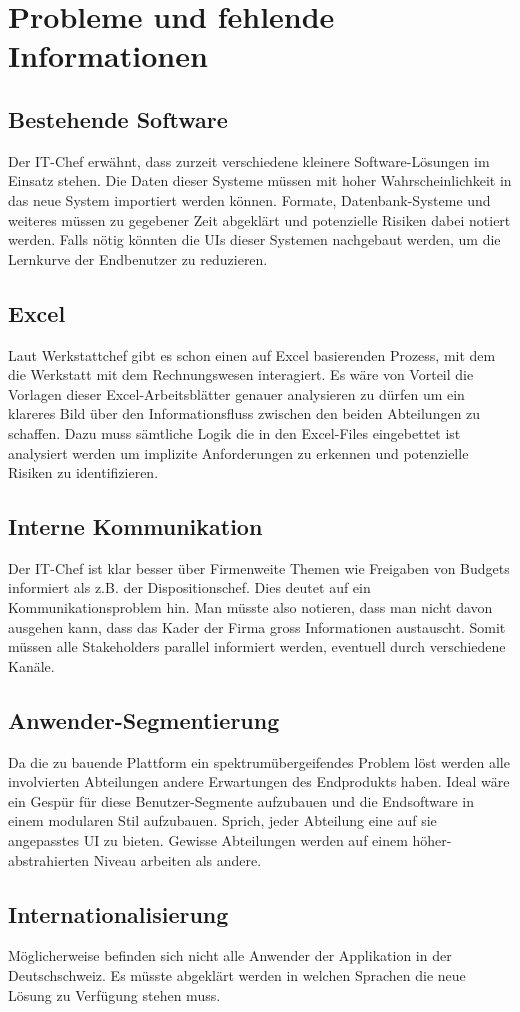 \section{Probleme und fehlende Informationen}

  \subsection{Bestehende Software}
  Der IT-Chef erwähnt, dass zurzeit verschiedene kleinere Software-Lösungen im Einsatz stehen.
  Die Daten dieser Systeme müssen mit hoher Wahrscheinlichkeit in das neue System importiert werden können.
  Formate, Datenbank-Systeme und weiteres müssen zu gegebener Zeit abgeklärt und potenzielle Risiken dabei notiert werden.
  Falls nötig könnten die UIs dieser Systemen nachgebaut werden, um die Lernkurve der Endbenutzer zu reduzieren.

  \subsection{Excel}
  Laut Werkstattchef gibt es schon einen auf Excel basierenden Prozess, mit dem die Werkstatt mit dem Rechnungswesen interagiert.
  Es wäre von Vorteil die Vorlagen dieser Excel-Arbeitsblätter genauer analysieren zu dürfen um ein klareres Bild über den Informationsfluss zwischen den beiden Abteilungen zu schaffen.
  Dazu muss sämtliche Logik die in den Excel-Files eingebettet ist analysiert werden um implizite Anforderungen zu erkennen und potenzielle Risiken zu identifizieren.
  
  \subsection{Interne Kommunikation}
  Der IT-Chef ist klar besser über Firmenweite Themen wie Freigaben von Budgets informiert als z.B. der Dispositionschef. Dies deutet auf ein Kommunikationsproblem hin.
  Man müsste also notieren, dass man nicht davon ausgehen kann, dass das Kader der Firma gross Informationen austauscht. Somit müssen alle Stakeholders parallel informiert werden, eventuell durch verschiedene Kanäle.

  \subsection{Anwender-Segmentierung}
  Da die zu bauende Plattform ein spektrumübergeifendes Problem löst werden alle involvierten Abteilungen andere Erwartungen des Endprodukts haben.
  Ideal wäre ein Gespür für diese Benutzer-Segmente aufzubauen und die Endsoftware in einem modularen Stil aufzubauen. Sprich, jeder Abteilung eine auf sie angepasstes UI zu bieten.
  Gewisse Abteilungen werden auf einem höher-abstrahierten Niveau arbeiten als andere.
  
  \subsection{Internationalisierung}
  Möglicherweise befinden sich nicht alle Anwender der Applikation in der Deutschschweiz. Es müsste abgeklärt werden in welchen Sprachen die neue Lösung zu Verfügung stehen muss.
